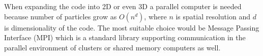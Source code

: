 \documentclass[oneside,branding,toc,article]{satdoc}
\begin{document}
When expanding the code into 2D or even 3D a parallel computer is needed
because number of particles grow as $O(n^d)$, where $n$ is spatial resolution
and $d$ is dimensionality of the code.  The most suitable choice would be
Message Passing Interface (MPI) which is a standard library supporting
communication in the parallel environment of clusters or shared memory
computers as well.



\end{document}
